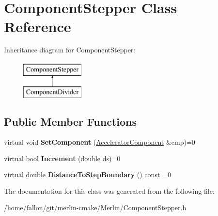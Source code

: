 \hypertarget{classComponentStepper}{}\section{Component\+Stepper Class Reference}
\label{classComponentStepper}
Inheritance diagram for Component\+Stepper\+:\begin{figure}[H]
\begin{center}
\leavevmode
\includegraphics[height=2.000000cm]{classComponentStepper}
\end{center}
\end{figure}
\subsection*{Public Member Functions}
\begin{DoxyCompactItemize}
\item 
\mbox{\label{classComponentStepper_a998dc625427f105d0785c84991d181e4}} 
virtual void {\bfseries Set\+Component} (\hyperlink{classAcceleratorComponent}{Accelerator\+Component} \&cmp)=0
\item 
\mbox{\label{classComponentStepper_aebd8148108e7c10ac9e01a3dedfae6d2}} 
virtual bool {\bfseries Increment} (double ds)=0
\item 
\mbox{\label{classComponentStepper_adfa9b6cc805623310bb9b7125b116842}} 
virtual double {\bfseries Distance\+To\+Step\+Boundary} () const =0
\end{DoxyCompactItemize}


The documentation for this class was generated from the following file\+:\begin{DoxyCompactItemize}
\item 
/home/fallon/git/merlin-\/cmake/\+Merlin/Component\+Stepper.\+h\end{DoxyCompactItemize}
